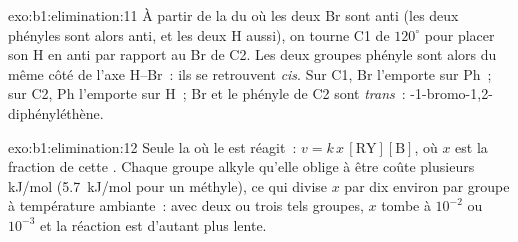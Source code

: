 \begin{solution}{exo:b1:elimination:11}
À partir de la  du  où les deux Br sont anti
(les deux phényles sont alors anti, et les deux H aussi), on tourne C1
de $120^\circ$ pour placer son H en anti par rapport au Br de C2. Les
deux groupes phényle sont alors du même côté de l'axe H--Br~: ils se
retrouvent \textit{cis}. Sur C1, Br l'emporte sur Ph~; sur C2, Ph
l'emporte sur H~; Br et le phényle de C2 sont \textit{trans}~:
-1-bromo-1,2-diphényléthène.
\end{solution}

\begin{solution}{exo:b1:elimination:12}
Seule la  où le  est  réagit~:
$v = k\,x\,[\mathrm{RY}][\mathrm{B}]$, où $x$ est la fraction de cette
. Chaque groupe alkyle qu'elle oblige à être  coûte plusieurs
kJ/mol (\qty{5.7}{kJ/mol} pour un méthyle), ce qui divise $x$ par dix
environ par groupe à température ambiante~: avec deux ou trois tels
groupes, $x$ tombe à $10^{-2}$ ou $10^{-3}$ et la réaction est d'autant
plus lente.
\end{solution}

